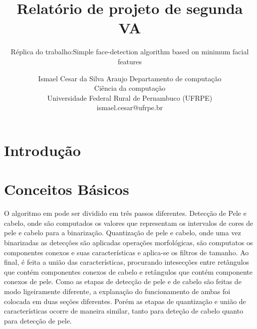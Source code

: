 \documentclass[journal,onecolumn]{IEEEtran}
\title{Relatório de projeto de segunda VA}
\subtitle{Réplica do trabalho:Simple face-detection algorithm based on minimum facial features}
\author{		Ismael Cesar da Silva Araujo
  				Departamento de computação \\
				  Ciência da computação\\
		Universidade Federal Rural de Pernambuco (UFRPE)\\
			ismael.cesar@ufrpe.br}
\date{}
\begin{document}
\maketitle

\section{Introdução}

\section{Conceitos Básicos}
	\label{sec:conceitosBasicos}
	O algoritmo em \cite{chen2007simple} pode ser dividido em três passos diferentes. 
	Detecção de Pele e cabelo, onde são computados os valores que representam os intervalos de cores de pele e cabelo para a binarização. 
	Quantização de pele e cabelo, onde uma vez binarizadas as detecções são aplicadas operações morfológicas, são computatos os componentes conexos e suas características e aplica-se os filtros de tamanho.
	Ao final, é feita a união das características, procurando intesecções entre retângulos que contém componentes conexos de cabelo e retângulos que contém componente conexos de pele.
	Como as etapas de detecção de pele e de cabelo são feitas de modo ligeiramente diferente, a explanação do funcionamento de ambas foi colocada em duas seções diferentes.
	Porém as etapas de quantização e união de características ocorre de maneira similar, tanto para deteção de cabelo quanto para detecção de pele.
	
\end{document}
